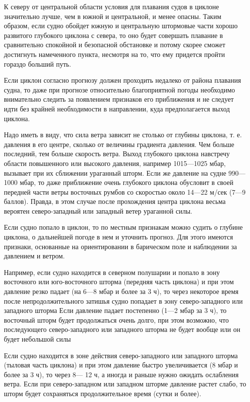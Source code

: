 К северу от центральной области условия для плавания судов в циклоне значительно лучше, чем в южной и центральной, и менее опасны. Таким образом, если судно обойдет южную и центральную штормовые части хорошо развитого глубокого циклона с севера, то оно будет совершать плавание в сравнительно спокойной и безопасной обстановке и потому скорее сможет достигнуть намеченного пункта, несмотря на то, что ему придется пройти гораздо больший путь.

Если циклон согласно прогнозу должен проходить недалеко от района плавания судна, то даже при прогнозе относительно благоприятной погоды необходимо внимательно следить за появлением признаков его приближения и не следует идти без крайней необходимости в направлении, куда предполагается выход циклона.

Надо иметь в виду, что сила ветра зависит не столько от глубины циклона, т. е. давления в его центре, сколько от величины градиента давления. Чем больше последний, тем больше скорость ветра. Выход глубокого циклона навстречу области повышенного или высокого давления, например 1015—1025 мбар, вызывает при их сближении ураганный шторм. Если же давление на судне 990—1000 мбар, то даже приближение очень глубокого циклона обусловит в своей передней части ветры восточных румбов со скоростью около 14—22 м/сек (7—9 баллов). Правда, в этом случае после прохождения центра циклона весьма вероятен северо-западный или западный ветер ураганной силы.

Если судно попало в циклон, то по местным признакам можно судить о глубине циклона, о дальнейшей погоде в нем и уточнить прогноз. Для этого имеются признаки, основанные на ориентировании в барическом поле и наблюдении за давлением и ветром.

Например, если судно находится в северном полушарии и попало в зону восточного или юго-восточного шторма (передняя часть циклона) и при этом давление резко падает (на 6—8 мбар и более за 3 ч), то через некоторое время после непродолжительного затишья судно попадает в зону северо-западного или западного шторма Если давление падает постепенно (1—2 мбар за 3 ч), то восточный шторм будет продолжаться очень долго, при этом возможно, что последующего северо-западного или западного шторма не будет вообще или он будет небольшой силы

Если судно находится в зоне действия северо-западного или западного шторма (тыловая часть циклона) и при этом давление быстро увеличивается (8 мбар и более за 3 ч), то через 8— 12 ч, а иногда и раньше нужно ожидать ослабления ветра. Если при северо-западном или западном шторме давление растет слабо, то шторм будет сохраняться продолжительное время (сутки и более).

